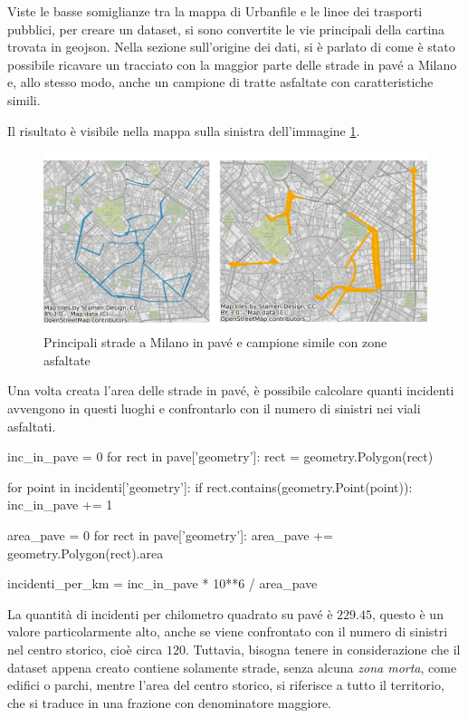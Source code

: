 \documentclass[a4paper]{report}
\newcommand{\quotestyle}[1]{\textit{#1}}
\begin{document}
Viste le basse somiglianze tra la mappa di Urbanfile e le linee dei trasporti pubblici, 
per creare un dataset, si sono convertite le vie principali della cartina trovata 
in geojson. 
Nella sezione sull'origine dei dati, si è parlato di come è stato possibile ricavare 
un tracciato con la maggior parte delle strade in pavé a Milano e, allo stesso modo, 
anche un campione di tratte asfaltate con caratteristiche simili. 

Il risultato è visibile nella mappa sulla sinistra dell'immagine \ref{fig:mappa-pave}. 

\begin{figure}
    \includegraphics[width=\linewidth]{img_unite/mappa_pave_asfalto.png}
    \caption{Principali strade a Milano in pavé e campione simile con zone asfaltate}
    \label{fig:mappa-pave}
\end{figure}

Una volta creata l'area delle strade in pavé, è possibile calcolare quanti 
incidenti avvengono in questi luoghi e confrontarlo con il numero di sinistri 
nei viali asfaltati. 

\begin{code}
inc_in_pave = 0
for rect in pave['geometry']: 
    rect = geometry.Polygon(rect)

    for point in incidenti['geometry']: 
        if rect.contains(geometry.Point(point)): 
            inc_in_pave += 1

area_pave = 0
for rect in pave['geometry']: 
    area_pave += geometry.Polygon(rect).area

incidenti_per_km = inc_in_pave * 10**6 / area_pave
\end{code}

La quantità di incidenti per chilometro quadrato su pavé è $229.45$, 
questo è un valore particolarmente alto, anche se viene confrontato con il numero di 
sinistri nel centro storico, cioè circa $120$. 
Tuttavia, bisogna tenere in considerazione che il dataset appena creato 
contiene solamente strade, senza alcuna \quotestyle{zona morta}, 
come edifici o parchi, mentre l'area del centro storico, 
si riferisce a tutto il territorio, che si traduce in una frazione con 
denominatore maggiore. 
\end{document}
